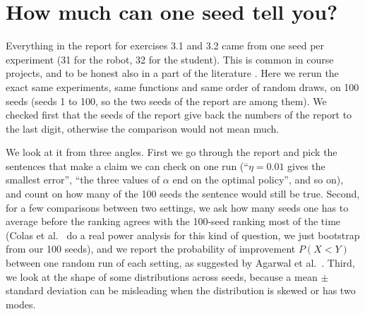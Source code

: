 \section{How much can one seed tell you?}
\label{sec:seeds}

Everything in the report for exercises 3.1 and 3.2 came from one seed per experiment (31 for the robot, 32 for the student). This is common in course projects, and to be honest also in a part of the literature \cite{henderson2018}. Here we rerun the exact same experiments, same functions and same order of random draws, on 100 seeds (seeds 1 to 100, so the two seeds of the report are among them). We checked first that the seeds of the report give back the numbers of the report to the last digit, otherwise the comparison would not mean much.

We look at it from three angles. First we go through the report and pick the sentences that make a claim we can check on one run (``$\eta = 0.01$ gives the smallest error'', ``the three values of $\alpha$ end on the optimal policy'', and so on), and count on how many of the 100 seeds the sentence would still be true. Second, for a few comparisons between two settings, we ask how many seeds one has to average before the ranking agrees with the 100-seed ranking most of the time (Colas et al.\ \cite{colas2018} do a real power analysis for this kind of question, we just bootstrap from our 100 seeds), and we report the probability of improvement $P(X < Y)$ between one random run of each setting, as suggested by Agarwal et al.\ \cite{agarwal2021}. Third, we look at the shape of some distributions across seeds, because a mean $\pm$ standard deviation can be misleading when the distribution is skewed or has two modes.
